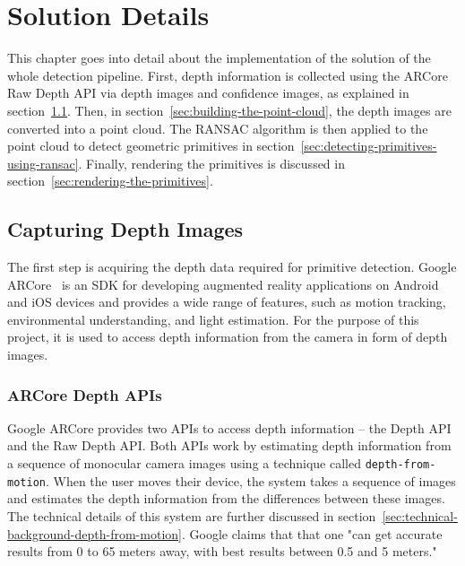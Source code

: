\chapter{Solution Details}

This chapter goes into detail about the implementation of the solution of the whole detection pipeline.
First, depth information is collected using the ARCore Raw Depth API via depth images and confidence images, as explained in section~\ref{sec:capturing-depth-images}.
Then, in section~\ref{sec:building-the-point-cloud}, the depth images are converted into a point cloud.
The RANSAC algorithm is then applied to the point cloud to detect geometric primitives in section~\ref{sec:detecting-primitives-using-ransac}.
Finally, rendering the primitives is discussed in section~\ref{sec:rendering-the-primitives}.


\section{Capturing Depth Images}\label{sec:capturing-depth-images}
The first step is acquiring the depth data required for primitive detection.
Google ARCore~\parencite{google_llc_arcore_doc} is an SDK for developing augmented reality applications on Android and iOS devices
and provides a wide range of features, such as motion tracking, environmental understanding, and light estimation.
For the purpose of this project, it is used to access depth information from the camera in form of depth images.

\subsection{ARCore Depth APIs}
Google ARCore provides two APIs to access depth information -- the Depth API and the Raw Depth API\@.
Both APIs work by estimating depth information from a sequence of monocular camera images using
a technique called \texttt{depth-from-motion}.
When the user moves their device, the system takes a sequence of images and estimates the depth information from the differences between these images.
The technical details of this system are further discussed in section~\ref{sec:technical-background-depth-from-motion}.
Google claims that that one "can get accurate results from 0 to 65 meters away,
with best results between 0.5 and 5 meters."~\parencite{google_llc_arcore_doc}

